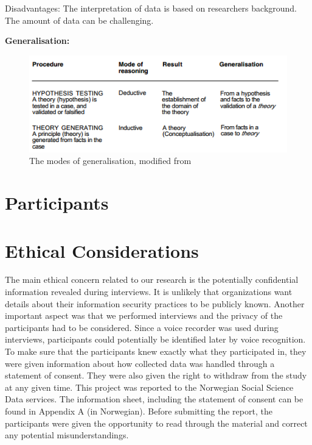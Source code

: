 Disadvantages:
The interpretation of data is based on researchers background.
The amount of data can be challenging.

\textbf{Generalisation:}


\begin{figure}[H]
\begin{center}
\includegraphics[scale=0.9]{ModesOfGeneralisation.png}
\caption[The modes of generalisation]{The modes of generalisation, modified from \cite{johansson2003case}}
\label{fig:modesofgeneralisation}
\end{center}
\end{figure}

\section{Participants}

\section{Ethical Considerations}
\label{sec:ethical}
The main ethical concern related to our research is the potentially confidential information revealed during interviews. It is unlikely that organizations want details about their information security practices to be publicly known. Another important aspect was that we performed interviews and the privacy of the participants had to be considered. Since a voice recorder was used during interviews, participants could potentially be identified later by voice recognition. To make sure that the participants knew exactly what they participated in, they were given information about how collected data was handled through a statement of consent. They were also given the right to withdraw from the study at any given time. This project was reported to the Norwegian Social Science Data services. The information sheet, including the statement of consent can be found in Appendix A (in Norwegian). Before submitting the report, the participants were given the opportunity to read through the material and correct any potential misunderstandings.   

